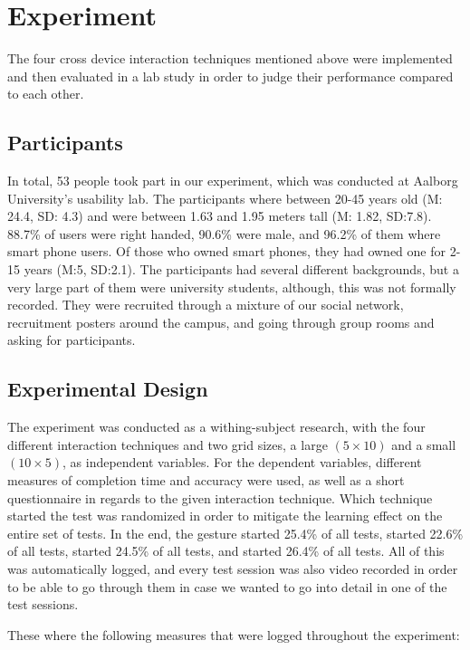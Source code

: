\section{Experiment} \label{sec:experiment}
The four cross device interaction techniques mentioned above were implemented and then evaluated in a lab study in order to judge their performance compared to each other.

\subsection{Participants}
In total, 53 people took part in our experiment, which was conducted at Aalborg University's usability lab. 
The participants where between 20-45 years old (M: 24.4, SD: 4.3) and were between 1.63 and 1.95 meters tall (M: 1.82, SD:7.8). 
88.7\% of users were right handed, 90.6\% were male, and 96.2\% of them where smart phone users. 
Of those who owned smart phones, they had owned one for 2-15 years (M:5, SD:2.1). 
The participants had several different backgrounds, but a very large part of them were university students, although, this was not formally recorded. 
They were recruited through a mixture of our social network, recruitment posters around the campus, and going through group rooms and asking for participants. 

\subsection{Experimental Design}\label{sec:expdesign}
The experiment was conducted as a withing-subject research, with the four different interaction techniques and two grid sizes, a large $(5 \times 10)$ and a small $(10 \times 5)$, as independent variables.
For the dependent variables, different measures of completion time and accuracy were used, as well as a short questionnaire in regards to the given interaction technique. 
Which technique started the test was randomized in order to mitigate the learning effect on the entire set of tests. 
In the end, the \pinch gesture started 25.4\% of all tests, \swipe started 22.6\% of all tests, \throw started 24.5\% of all tests, and \tilt started 26.4\% of all tests. 
All of this was automatically logged, and every test session was also video recorded in order to be able to go through them in case we wanted to go into detail in one of the test sessions.

These where the following measures that were logged throughout the experiment:

